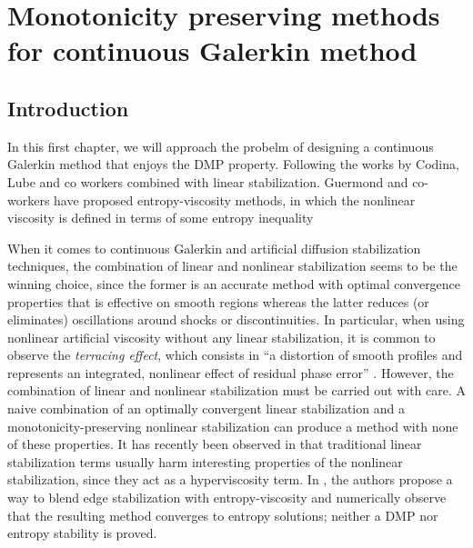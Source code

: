 \chapter{Monotonicity preserving methods for continuous Galerkin method}
\label{chap-paper1}
\section{Introduction}\label{s-intro}
%
In this first chapter, we will approach the probelm of designing a continuous Galerkin method that enjoys the DMP property. Following the works by Codina, Lube and co workers  \cite{codina_stabilization_2000,lube_residual-based_2006,john_spurious_2007,john_spurious_2008} combined with linear stabilization. Guermond and co-workers have proposed entropy-viscosity methods, %
 in which the nonlinear viscosity is defined in terms of some entropy inequality \cite{guermond_entropy_2011}

When it comes to continuous Galerkin and artificial diffusion stabilization techniques, the combination of linear and nonlinear stabilization seems to be the winning choice, since the former is an accurate method with optimal convergence properties that is effective on smooth regions whereas the latter reduces (or eliminates) oscillations around shocks or discontinuities. In par\-ti\-cular, when using nonlinear artificial viscosity without any linear stabilization, it is common to observe the \emph{terracing effect}, which consists in ``a distortion of smooth profiles and represents an integrated, nonlinear effect of residual phase error'' \cite{kuzmin_flux-corrected_2005,oran_numerical_2005}. However, the combination of linear
and non\-li\-near stabilization must be carried out with care. A naive combination of an 
optimally convergent linear stabilization and a monotonicity-preserving nonlinear
stabilization can produce a method with none of these properties. It has recently been 
observed in \cite{ern_weighting_2012} that traditional linear stabilization terms usually harm interesting properties of the nonlinear stabilization, since they act as a hyperviscosity term. In \cite{ern_weighting_2012}, the authors propose a way to blend edge stabilization  \cite{burman_edge_2004} with entropy-viscosity and numerically observe that the resulting method converges to entropy
solutions; neither a DMP nor entropy stability is proved.

